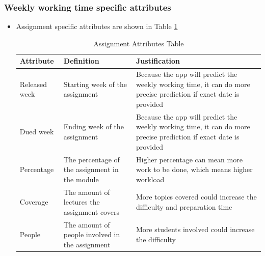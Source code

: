 \documentclass[fyp]{socreport}
\begin{document}
\subsubsection{Weekly working time specific attributes}
\begin{itemize}
	\item Assignment specific attributes are shown in Table {\ref{assignment-attribute}}
	\begin{table}[]
	\centering
	\begin{tabular}{|p{}|p{}|p{}|}
	\hline
		\rowcolor[HTML]{C0C0C0}
	  \textbf{Attribute} & \textbf{Definition} & \textbf{Justification} \\
	\hline
	Released week & Starting week of the assignment & Because the app will predict the weekly working time, it can do more precise prediction if exact date is provided \\
	\hline
	Dued week & Ending week of the assignment & Because the app will predict the weekly working time, it can do more precise prediction if exact date is provided \\
	\hline
	Percentage & The percentage of the assignment in the module & Higher percentage can mean more work to be done, which means higher workload \\
	\hline
	Coverage & The amount of lectures the assignment covers & More topics covered could increase the difficulty and preparation time \\
	\hline
	People & The amount of people involved in the assignment & More students involved could increase the difficulty \\
	\hline
	\end{tabular}
	\caption{Assignment Attributes Table}
	\label{assignment-attribute}
	\end{table}


\end{itemize}
\end{document}
